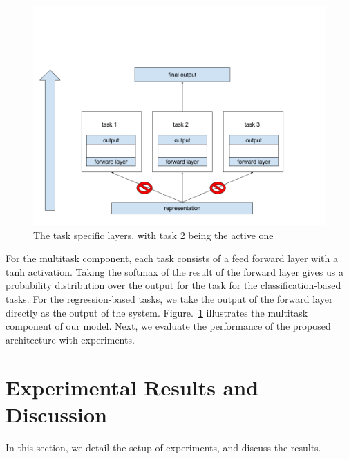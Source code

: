 \documentclass{article}
\begin{document}
\begin{figure}[h!]
\centering
\includegraphics[scale=.2]{task_layers.png}
\caption{The task specific layers, with task 2 being the active one}
\label{fig:task}
\end{figure}

For the multitask component, each task consists of a feed forward layer with a tanh activation.  Taking the softmax of the result of the forward layer gives us a probability distribution over the output for the task for the classification-based tasks.  For the regression-based tasks, we take the output of the forward layer directly as the output of the system. Figure.~\ref{fig:task} illustrates the multitask component of our model. Next, we evaluate the performance of the proposed architecture with experiments.

\section{Experimental Results and Discussion}
In this section, we detail the setup of experiments, and discuss the results.
\end{document}
